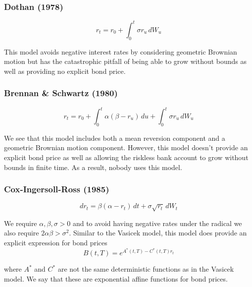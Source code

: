 \documentclass[12pt]{article}
\newlength\tindent
\renewcommand{\indent}{\hspace*{\tindent}}
\begin{document}
\subsubsection{Dothan (1978)}
\begin{equation*}
	r_t = r_0 + \int^t_0 \sigma r_u\,dW_u
\end{equation*}

\indent This model avoids negative interest rates by considering geometric Brownian motion but has the catastrophic pitfall of being able to grow without bounds as well as providing no explicit bond price.


\subsubsection{Brennan \& Schwartz (1980)} 
\begin{equation*}
	r_t = r_0 + \int^t_0 \alpha(\beta - r_u)\,du + \int^t_0 \sigma r_u\,dW_u
\end{equation*}

\indent We see that this model includes both a mean reversion component and a geometric Brownian motion component. However, this model doesn't provide an explicit bond price as well as allowing the riskless bank account to grow without bounds in finite time. As a result, nobody uses this model.

\subsubsection{Cox-Ingersoll-Ross (1985)}
\begin{equation*}
	dr_t = \beta(\alpha - r_t)\,dt + \sigma\sqrt{r_t}\,dW_t
\end{equation*}

\indent We require $\alpha, \beta, \sigma > 0$ and to avoid having negative rates under the radical we also require $2\alpha\beta > \sigma^2$. Similar to the Vasicek model, this model does provide an explicit expression for bond prices 
\begin{equation*}
	B(t,T) = e^{A^*(t,T) - C^*(t,T)r_t}
\end{equation*}

where $A^*$ and $C^*$ are not the same deterministic functions as in the Vasicek model. We say that these are exponential affine functions for bond prices.
\end{document}
